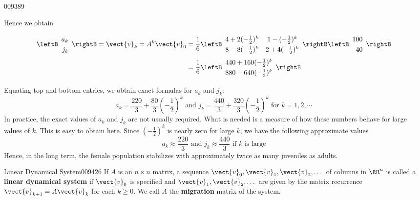 \begin{example}{}{009389}
\begin{solution}
Hence we obtain

\begin{align*}
\leftB \begin{array}{r}
a_k \\
j_k
\end{array}\rightB = \vect{v}_k = A^k \vect{v}_0 & = \frac{1}{6}
\leftB \def\arraystretch{1.25} \begin{array}{cc}
4+2(-\frac{1}{2})^k & 1-(-\frac{1}{2})^k \\
8-8(-\frac{1}{2})^k & 2+4(-\frac{1}{2})^k \end{array}\rightB \leftB \begin{array}{r}
100 \\
40
\end{array}\rightB \\
&= \frac{1}{6} \leftB \def\arraystretch{1.25}\begin{array}{cc}
440 + 160 (-\frac{1}{2})^k \\
880 - 640 (-\frac{1}{2})^k 
\end{array}\rightB
\end{align*}

Equating top and bottom entries, we obtain exact formulas for $a_{k}$ and $j_{k}$:
\begin{equation*}
a_k = \frac{220}{3} + \frac{80}{3}\left(-\frac{1}{2}\right)^k \mbox{ and } j_k = \frac{440}{3} + \frac{320}{3}\left(-\frac{1}{2}\right)^k \mbox{ for } k = 1,2,\cdots
\end{equation*}
In practice, the exact values of $a_{k}$ and $j_{k}$ are not usually required. What is needed is a measure of how these numbers behave for large values of $k$. This is easy to obtain here. Since $(-\frac{1}{2})^{k}$ is nearly zero for large $k$, we have the following approximate values
\begin{equation*}
a_k \approx \frac{220}{3} \mbox{ and } j_k \approx \frac{440}{3} \mbox{ if } k \mbox{ is large}
\end{equation*}
Hence, in the long term, the female population stabilizes with approximately twice as many juveniles as adults.
\end{solution}
\end{example}

\begin{definition}{Linear Dynamical System}{009426}
If $A$ is an $n \times n$ matrix, a sequence $\vect{v}_{0}, \vect{v}_{1}, \vect{v}_{2}, \dots$  of columns in $\RR^n$ is called a \textbf{linear dynamical system} if $\vect{v}_{0}$ is specified and $\vect{v}_{1}, \vect{v}_{2}, \dots $ are given by the matrix recurrence $\vect{v}_{k+1}= A\vect{v}_{k}$ for each $k \geq 0$. We call $A$ the \textbf{migration} matrix of the system. 
\end{definition}

